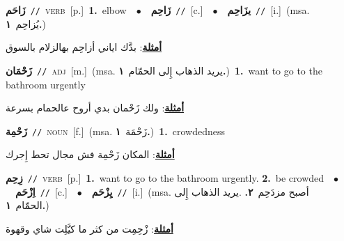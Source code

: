 \documentclass[10pt,a4paper,twoside]{article} %
\begin{document}
\begin{multicols}{2}
{\setlength\topsep{0pt}\textbf{\foreignlanguage{arabic}{زَاحَم}}\ {\color{gray}\texttt{//}\color{black}}\ \textsc{verb}\ [p.]\ \textbf{1.}~elbow\ \ $\bullet$\ \ \setlength\topsep{0pt}\textbf{\foreignlanguage{arabic}{زَاحِم}}\ {\color{gray}\texttt{//}\color{black}}\ [c.]\ \ $\bullet$\ \ \setlength\topsep{0pt}\textbf{\foreignlanguage{arabic}{يزَاحِم}}\ {\color{gray}\texttt{//}\color{black}}\ [i.]\ \color{gray}(msa. \foreignlanguage{arabic}{يُزاحِم}~\foreignlanguage{arabic}{\textbf{١.}})\color{black}\  \begin{flushright}\color{gray}\foreignlanguage{arabic}{\textbf{\underline{\foreignlanguage{arabic}{أمثلة}}}: بدَّك اياني أزاحِم بهالزلام بالسوق}\end{flushright}\color{black}} \vspace{2mm}

{\setlength\topsep{0pt}\textbf{\foreignlanguage{arabic}{زَحْمَان}}\ {\color{gray}\texttt{//}\color{black}}\ \textsc{adj}\ [m.]\ \color{gray}(msa. \foreignlanguage{arabic}{يريد الذهاب إِلى الحمّام}~\foreignlanguage{arabic}{\textbf{١.}})\color{black}\ \textbf{1.}~want to go to the bathroom urgently\  \begin{flushright}\color{gray}\foreignlanguage{arabic}{\textbf{\underline{\foreignlanguage{arabic}{أمثلة}}}: ولك زَحْمان بدي أروح عالحمام بسرعة}\end{flushright}\color{black}} \vspace{2mm}

{\setlength\topsep{0pt}\textbf{\foreignlanguage{arabic}{زَحْمِة}}\ {\color{gray}\texttt{//}\color{black}}\ \textsc{noun}\ [f.]\ \color{gray}(msa. \foreignlanguage{arabic}{زَحْمَة}~\foreignlanguage{arabic}{\textbf{١.}})\color{black}\ \textbf{1.}~crowdedness\  \begin{flushright}\color{gray}\foreignlanguage{arabic}{\textbf{\underline{\foreignlanguage{arabic}{أمثلة}}}: المكان زَحْمِة فش مجال تحط إِجرك}\end{flushright}\color{black}} \vspace{2mm}

{\setlength\topsep{0pt}\textbf{\foreignlanguage{arabic}{زِحِم}}\ {\color{gray}\texttt{//}\color{black}}\ \textsc{verb}\ [p.]\ \textbf{1.}~want to go to the bathroom urgently.  \textbf{2.}~be crowded\ \ $\bullet$\ \ \setlength\topsep{0pt}\textbf{\foreignlanguage{arabic}{اِزْحَم}}\ {\color{gray}\texttt{//}\color{black}}\ [c.]\ \ $\bullet$\ \ \setlength\topsep{0pt}\textbf{\foreignlanguage{arabic}{يِزْحَم}}\ {\color{gray}\texttt{//}\color{black}}\ [i.]\ \color{gray}(msa. \foreignlanguage{arabic}{أصبح مزدَحِم}~\foreignlanguage{arabic}{\textbf{٢.}}  .\foreignlanguage{arabic}{يريد الذهاب إِلى الحمّام}~\foreignlanguage{arabic}{\textbf{١.}})\color{black}\  \begin{flushright}\color{gray}\foreignlanguage{arabic}{\textbf{\underline{\foreignlanguage{arabic}{أمثلة}}}: زْحِمِت من كثر ما كيَّلِت شاي وقهوة}\end{flushright}\color{black}} \vspace{2mm}


\end{multicols}
\end{document}
